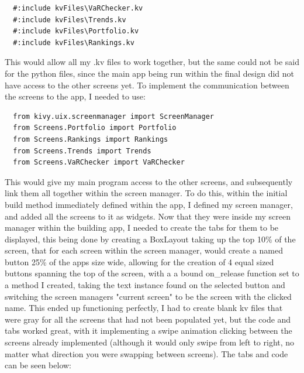 \documentclass{article}
\begin{document}
\begin{verbatim}
  #:include kvFiles\VaRChecker.kv
  #:include kvFiles\Trends.kv
  #:include kvFiles\Portfolio.kv
  #:include kvFiles\Rankings.kv
\end{verbatim}

\vspace{0.3cm}
This would allow all my .kv files to work together, but the same could not be said for the python files, since the main app being run within the final design did not have access to the other screens yet. To implement the communication between the screens to the app, I needed to use: \\\vspace{0.3cm}

\begin{verbatim}
  from kivy.uix.screenmanager import ScreenManager
  from Screens.Portfolio import Portfolio
  from Screens.Rankings import Rankings
  from Screens.Trends import Trends
  from Screens.VaRChecker import VaRChecker

\end{verbatim}

This would give my main program access to the other screens, and subsequently link them all together within the screen manager. To do this, within the initial build method immediately defined within the app, I defined my screen manager, and added all the screens to it as widgets. Now that they were inside my screen manager within the building app, I needed to create the tabs for them to be displayed, this being done by creating a BoxLayout taking up the top 10\% of the screen, that for each screen within the screen manager, would create a named button 25\% of the apps size wide, allowing for the creation of 4 equal sized buttons spanning the top of the screen, with a a bound on\_release function set to a method I created, taking the text instance found on the selected button and switching the screen managers "current screen" to be the screen with the clicked name. This ended up functioning perfectly, I had to create blank kv files that were gray for all the screens that had not been populated yet, but the code and tabs worked great, with it implementing a swipe animation clicking between the screens already implemented (although it would only swipe from left to right, no matter what direction you were swapping between screens). The tabs and code can be seen below:\\\vspace{0.3cm}
\end{document}
